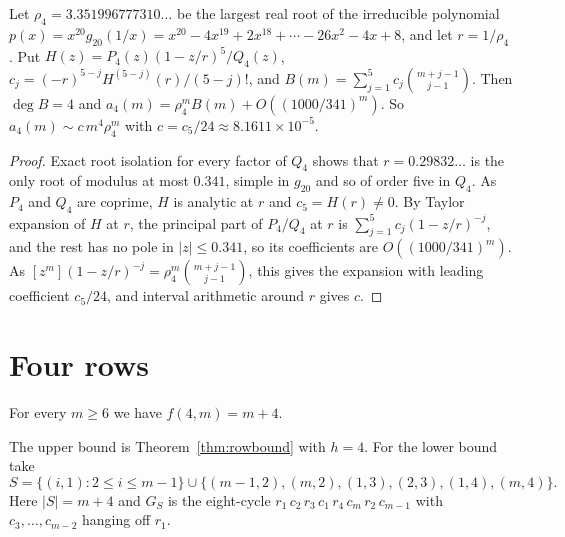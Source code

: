 \begin{corollary}\label{cor:fourgrowth}
Let $\rho_4=3.351996777310\ldots$ be the largest real root of the irreducible polynomial $p(x)=x^{20}g_{20}(1/x)=x^{20}-4x^{19}+2x^{18}+\cdots-26x^2-4x+8$, and let $r=1/\rho_4$. Put $H(z)=P_4(z)(1-z/r)^5/Q_4(z)$, $c_j=(-r)^{5-j}H^{(5-j)}(r)/(5-j)!$, and $B(m)=\sum_{j=1}^{5}c_j\binom{m+j-1}{j-1}$. Then $\deg B=4$ and $a_4(m)=\rho_4^m B(m)+O((1000/341)^m)$. So $a_4(m)\sim c\,m^4\rho_4^m$ with $c=c_5/24\approx8.1611\times10^{-5}$.
\end{corollary}

\begin{proof}
Exact root isolation for every factor of $Q_4$ shows that $r=0.29832\ldots$ is the only root of modulus at most $0.341$, simple in $g_{20}$ and so of order five in $Q_4$. As $P_4$ and $Q_4$ are coprime, $H$ is analytic at $r$ and $c_5=H(r)\ne0$. By Taylor expansion of $H$ at $r$, the principal part of $P_4/Q_4$ at $r$ is $\sum_{j=1}^{5}c_j(1-z/r)^{-j}$, and the rest has no pole in $|z|\le0.341$, so its coefficients are $O((1000/341)^m)$. As $[z^m](1-z/r)^{-j}=\rho_4^m\binom{m+j-1}{j-1}$, this gives the expansion with leading coefficient $c_5/24$, and interval arithmetic around $r$ gives $c$.
\end{proof}

\section{Four rows}\label{sec:four}

\begin{theorem}\label{thm:fourvalue}
For every $m\ge6$ we have $f(4,m)=m+4$.
\end{theorem}

The upper bound is Theorem~\ref{thm:rowbound} with $h=4$. For the lower bound take
\begin{equation}\label{eq:fourS}
S=\{(i,1):2\le i\le m-1\}\cup\{(m-1,2),(m,2),(1,3),(2,3),(1,4),(m,4)\}.
\end{equation}
Here $|S|=m+4$ and $G_S$ is the eight-cycle $r_1\,c_2\,r_3\,c_1\,r_4\,c_m\,r_2\,c_{m-1}$ with $c_3,\ldots,c_{m-2}$ hanging off $r_1$.

